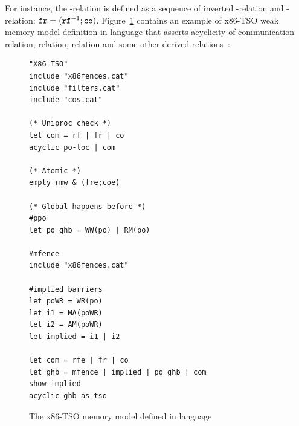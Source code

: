 For instance, the \fr-relation is defined as a sequence of inverted \rf-relation and \co-relation: $\mathtt{fr} = (\mathtt{rf}^{-1};\mathtt{co})$. Figure~\ref{example:x86-cat} contains an example of x86-TSO weak memory model definition in \cat{} language that asserts acyclicity of communication relation,  relation,  relation and some other derived relations~\cite{owens2009better}:

\begin{figure}[h]
\begin{lstlisting}
"X86 TSO"
include "x86fences.cat"
include "filters.cat"
include "cos.cat"

(* Uniproc check *)
let com = rf | fr | co
acyclic po-loc | com

(* Atomic *)
empty rmw & (fre;coe)

(* Global happens-before *)
#ppo
let po_ghb = WW(po) | RM(po)

#mfence
include "x86fences.cat"

#implied barriers
let poWR = WR(po)
let i1 = MA(poWR)
let i2 = AM(poWR)
let implied = i1 | i2

let com = rfe | fr | co
let ghb = mfence | implied | po_ghb | com
show implied
acyclic ghb as tso
\end{lstlisting}
\caption{The x86-TSO memory model defined in \cat{} language\protect\footnotemark}
\label{example:x86-cat}
\end{figure}



